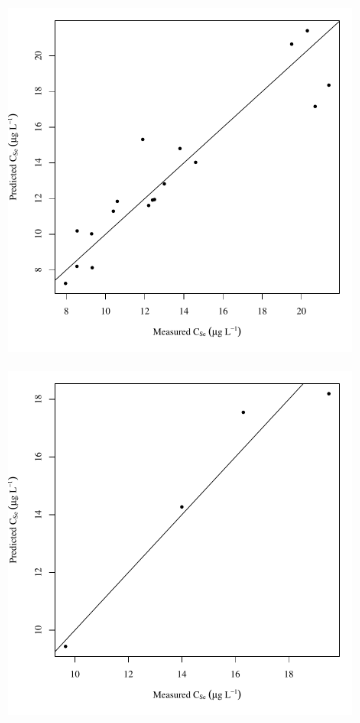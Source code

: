 \begin{linenumbers}
\subfiguremid
\begin{landscape}
	\begin{figure}
		\begin{subfigure}{0.7\textwidth}
			\centering
			\includegraphics[width=\tableCustomSize]{"Figures/Results_USR/Stochastic/Conc Model pred v meas TIM"}
		\end{subfigure}%
		\begin{subfigure}{0.7\textwidth}
			\centering
			\includegraphics[width=\tableCustomSize]{"Figures/Results_USR/Stochastic/Conc Model pred v meas HRC"}

\end{subfigure}
\end{figure}
\end{landscape}
\end{linenumbers}
